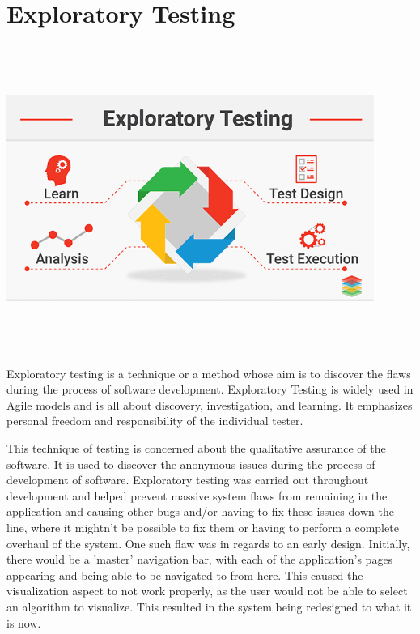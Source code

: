 \section{Exploratory Testing}
\begin{center}
    \includegraphics[width=12cm,height=10cm,keepaspectratio]{images/xenonstack-what-is-exploratory-testing}
\end{center}
Exploratory testing is a technique or a method whose aim is to discover the
flaws during the process of software development. Exploratory Testing is widely used in Agile models and is all about discovery, investigation, and learning. It emphasizes personal freedom and responsibility of the individual tester.

\par
\bigskip

This technique of testing is concerned about the qualitative assurance of the 
software. It is used to discover the anonymous issues during the process of 
development of software. Exploratory testing was carried out throughout development and helped prevent massive system flaws from remaining in the application and causing other bugs and/or having to fix these issues down the line, where it mightn't be possible to fix them or having to perform a complete overhaul of the system. One such flaw was in regards to an early design. Initially, there would be a 'master' navigation bar, with each of the application's pages appearing and being able to be navigated to from here. This caused the visualization aspect to not work properly, as the user would not be able to select an algorithm to visualize. This resulted in the system being redesigned to what it is now.

